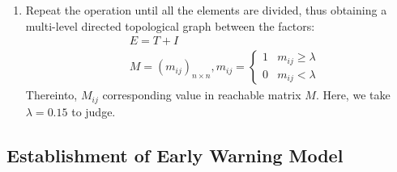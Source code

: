 \documentclass[12pt]{article}  %
\begin{document}
\begin{enumerate}
\item Repeat the operation until all the elements are divided, thus obtaining a multi-level directed topological graph between the factors:
\begin{eqnarray}
	&E=T+I\\
	&M=(m_{ij})_{n\times n},m_{ij}=\left\{\begin{matrix}
 1 &m_{ij}\ge \lambda \\
 0 &m_{ij}<\lambda
\end{matrix}\right.
\end{eqnarray}
Thereinto, $M_{ij}$ corresponding value in reachable matrix $M$. Here, we take $\lambda=0.15$ to judge.
\end{enumerate}
\subsection{Establishment of Early Warning Model}
\end{document}
